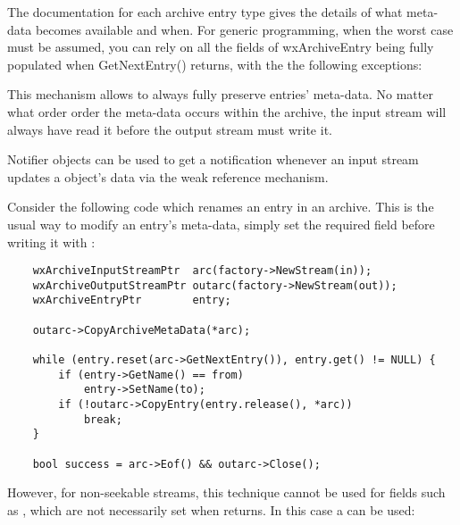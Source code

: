 The documentation for each archive entry type gives the details
of what meta-data becomes available and when. For generic programming,
when the worst case must be assumed, you can rely on all the fields
of wxArchiveEntry being fully populated when GetNextEntry() returns,
with the the following exceptions:

\begin{twocollist}\twocolwidtha{3cm}
\end{twocollist}

This mechanism allows 
to always fully preserve entries' meta-data. No matter what order order
the meta-data occurs within the archive, the input stream will always
have read it before the output stream must write it.


Notifier objects can be used to get a notification whenever an input
stream updates a  object's data
via the weak reference mechanism.

Consider the following code which renames an entry in an archive.
This is the usual way to modify an entry's meta-data, simply set the
required field before writing it with
 :

\begin{verbatim}
    wxArchiveInputStreamPtr  arc(factory->NewStream(in));
    wxArchiveOutputStreamPtr outarc(factory->NewStream(out));
    wxArchiveEntryPtr        entry;

    outarc->CopyArchiveMetaData(*arc);

    while (entry.reset(arc->GetNextEntry()), entry.get() != NULL) {
        if (entry->GetName() == from)
            entry->SetName(to);
        if (!outarc->CopyEntry(entry.release(), *arc))
            break;
    }

    bool success = arc->Eof() && outarc->Close();

\end{verbatim}

However, for non-seekable streams, this technique cannot be used for
fields such as ,
which are not necessarily set when
  returns. In
this case a  can be used:


